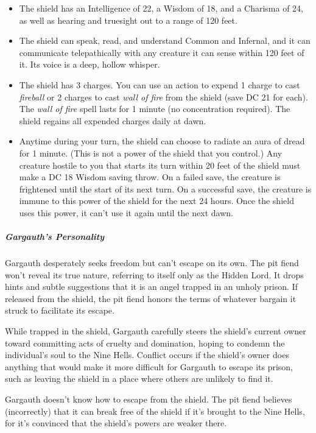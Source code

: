 \documentclass[10pt,a4paper,twoside,bg=print,twocolumn,openany,nodeprecatedcode]{dndbook}
\begin{document}
\begin{itemize}
\item The shield has an Intelligence of 22, a Wisdom of 18, and a Charisma of 24, as well as hearing and truesight out to a range of 120 feet.
\item The shield can speak, read, and understand Common and Infernal, and it can communicate telepathically with any creature it can sense within 120 feet of it. Its voice is a deep, hollow whisper.
\item The shield has 3 charges. You can use an action to expend 1 charge to cast \textit{fireball} or 2 charges to cast \textit{wall of fire} from the shield (save DC 21 for each). The \textit{wall of fire} spell lasts for 1 minute (no concentration required). The shield regains all expended charges daily at dawn.
\item Anytime during your turn, the shield can choose to radiate an aura of dread for 1 minute. (This is not a power of the shield that you control.) Any creature hostile to you that starts its turn within 20 feet of the shield must make a DC 18 Wisdom saving throw. On a failed save, the creature is frightened until the start of its next turn. On a successful save, the creature is immune to this power of the shield for the next 24 hours. Once the shield uses this power, it can't use it again until the next dawn.
\end{itemize}

\subparagraph{Gargauth's Personality}
Gargauth desperately seeks freedom but can't escape on its own. The pit fiend won't reveal its true nature, referring to itself only as the Hidden Lord. It drops hints and subtle suggestions that it is an angel trapped in an unholy prison. If released from the shield, the pit fiend honors the terms of whatever bargain it struck to facilitate its escape.

While trapped in the shield, Gargauth carefully steers the shield's current owner toward committing acts of cruelty and domination, hoping to condemn the individual's soul to the Nine Hells. Conflict occurs if the shield's owner does anything that would make it more difficult for Gargauth to escape its prison, such as leaving the shield in a place where others are unlikely to find it.

Gargauth doesn't know how to escape from the shield. The pit fiend believes (incorrectly) that it can break free of the shield if it's brought to the Nine Hells, for it's convinced that the shield's powers are weaker there.
\end{document}
